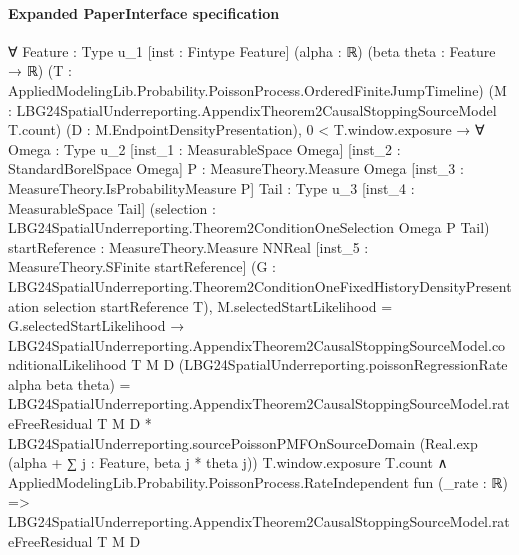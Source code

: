 \documentclass[10pt]{article}
\begin{document}
\paragraph{Expanded PaperInterface specification}
\begin{ReviewVerbatim}
∀ {Feature : Type u_1} [inst : Fintype Feature] (alpha : ℝ) (beta theta : Feature → ℝ)
  (T : AppliedModelingLib.Probability.PoissonProcess.OrderedFiniteJumpTimeline)
  (M : LBG24SpatialUnderreporting.AppendixTheorem2CausalStoppingSourceModel T.count)
  (D : M.EndpointDensityPresentation),
  0 < T.window.exposure →
    ∀ {Omega : Type u_2} [inst_1 : MeasurableSpace Omega] [inst_2 : StandardBorelSpace Omega]
      {P : MeasureTheory.Measure Omega} [inst_3 : MeasureTheory.IsProbabilityMeasure P] {Tail : Type u_3}
      [inst_4 : MeasurableSpace Tail]
      (selection : LBG24SpatialUnderreporting.Theorem2ConditionOneSelection Omega P Tail)
      {startReference : MeasureTheory.Measure NNReal} [inst_5 : MeasureTheory.SFinite startReference]
      (G : LBG24SpatialUnderreporting.Theorem2ConditionOneFixedHistoryDensityPresentation selection startReference T),
      M.selectedStartLikelihood = G.selectedStartLikelihood →
        LBG24SpatialUnderreporting.AppendixTheorem2CausalStoppingSourceModel.conditionalLikelihood T M D
              (LBG24SpatialUnderreporting.poissonRegressionRate alpha beta theta) =
            LBG24SpatialUnderreporting.AppendixTheorem2CausalStoppingSourceModel.rateFreeResidual T M D *
              LBG24SpatialUnderreporting.sourcePoissonPMFOnSourceDomain
                (Real.exp (alpha + ∑ j : Feature, beta j * theta j)) T.window.exposure T.count ∧
          AppliedModelingLib.Probability.PoissonProcess.RateIndependent fun (_rate : ℝ) =>
            LBG24SpatialUnderreporting.AppendixTheorem2CausalStoppingSourceModel.rateFreeResidual T M D
\end{ReviewVerbatim}
\end{document}
